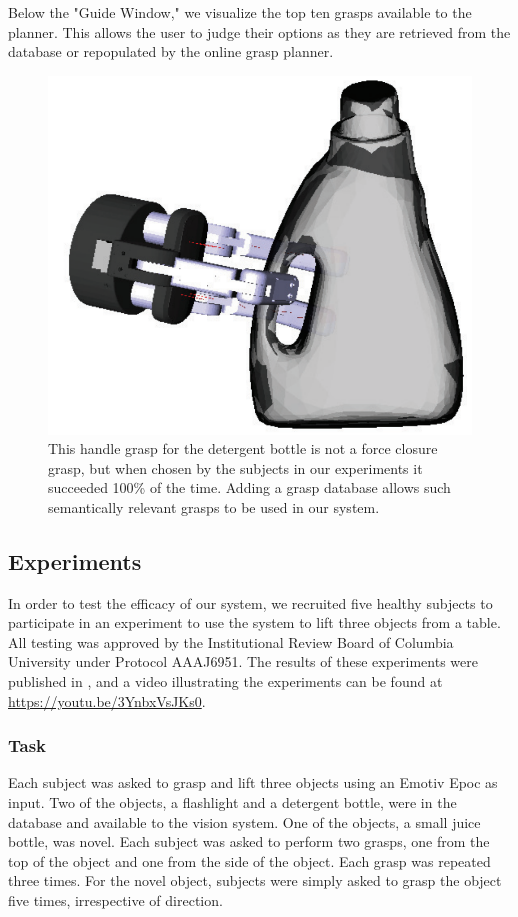 Below the "Guide Window," we visualize the top ten grasps available to the planner. This allows the user to judge their options as they are retrieved from the database or repopulated by the online grasp planner. 


\begin{figure}
\centering
\includegraphics[height=.2\textheight]{manual_grasp_1.png}
\caption{This handle grasp for the detergent bottle is not a force closure grasp, but when chosen by the subjects in our experiments it succeeded 100\% of the time. Adding a grasp database allows such semantically relevant grasps to be used in our system.}
\label{fig:manual_grasp_1}
\end{figure}


\subsection{Experiments}
In order to test the efficacy of our system, we recruited five healthy subjects to participate in an experiment to use the system to lift three objects from a table.  All testing was approved by the Institutional Review Board of Columbia University under Protocol AAAJ6951. The results of these experiments were published in \cite{Weisz2013}, and a video illustrating the experiments can be found at \url{https://youtu.be/3YnbxVsJKs0}.

\subsubsection{Task}
Each subject was asked to grasp and lift three objects using an Emotiv Epoc as input. Two of the objects, a flashlight and a detergent bottle, were in the database and available to the vision system. One of the objects, a small juice bottle, was novel. Each subject was asked to perform two grasps, one from the top of the object and one from the side of the object. Each grasp was repeated three times. For the novel object, subjects were simply asked to grasp the object five times, irrespective of direction.


